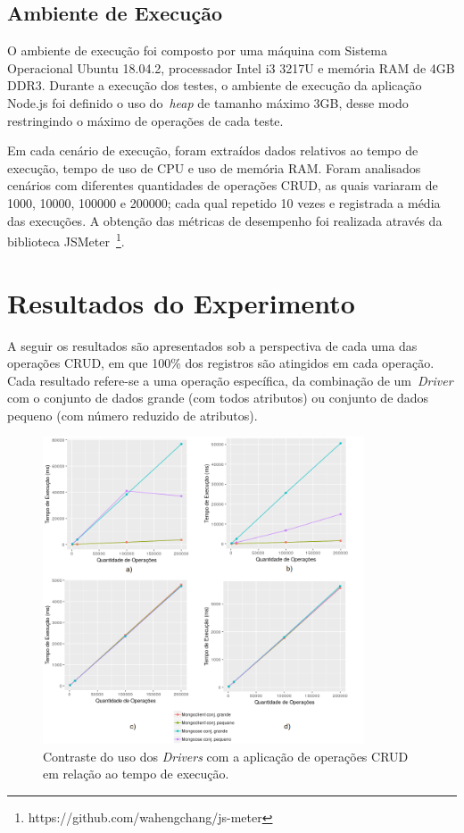 \documentclass[12pt]{article}
\begin{document}
\subsection{Ambiente de Execução}

O ambiente de execução foi composto por uma máquina com Sistema Operacional Ubuntu 18.04.2, processador Intel i3 3217U e memória RAM de 4GB DDR3. 
Durante a execução dos testes, o ambiente de execução da aplicação Node.js foi definido o uso do~\emph{heap} de tamanho máximo 3GB, desse modo restringindo o máximo de operações de cada teste.

Em cada cenário de execução, foram extraídos dados relativos ao tempo de execução, tempo de uso de CPU e uso de memória RAM. 
Foram analisados cenários com diferentes quantidades de operações CRUD, as quais variaram de 1000, 10000, 100000 e 200000; cada qual repetido 10 vezes e registrada a média das execuções. A obtenção das métricas de desempenho foi realizada através da biblioteca JSMeter~\footnote{https://github.com/wahengchang/js-meter}. 

\section{Resultados do Experimento}
\label{section:resultados}

A seguir os resultados são apresentados sob a perspectiva de cada uma das operações CRUD, em que 100\% dos registros são atingidos em cada operação. 
Cada resultado refere-se a uma operação específica, da combinação de um~\emph{Driver} com o conjunto de dados grande (com todos atributos) ou conjunto de dados pequeno (com número reduzido de atributos).

\begin{figure}[!ht]
\centering
\includegraphics[width=0.85\textwidth]{images/time}
\caption{Contraste do uso dos \emph{Drivers} com a aplicação de operações CRUD em relação ao tempo de execução.}
\label{fig:time}
\end{figure}
\end{document}

